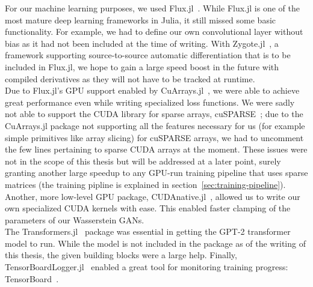 For our machine learning purposes, we used
Flux.jl~\cite{FluxMLFluxJl2019}. While Flux.jl is one of the most
mature deep learning frameworks in Julia, it still missed some basic
functionality. For example, we had to define our own convolutional
layer without bias as it had not been included at the time of writing.
With Zygote.jl~\cite{FluxMLZygoteJl2019}, a framework supporting
source-to-source automatic differentiation that is to be included in
Flux.jl, we hope to gain a large speed boost in the future with
compiled derivatives as they will not have to be tracked at runtime.
\\
Due to Flux.jl's GPU support enabled by
CuArrays.jl~\cite{JuliaGPUCuArraysJl2019}, we were able to achieve
great performance even while writing specialized loss functions. We
were sadly not able to support the CUDA library for sparse arrays,
cuSPARSE~\cite{CuSPARSE}; due to the CuArrays.jl package not
supporting all the features necessary for us (for example simple
primitives like array slicing) for cuSPARSE arrays, we had to
uncomment the few lines pertaining to sparse CUDA arrays at the
moment. These issues were not in the scope of this thesis but will be
addressed at a later point, surely granting another large speedup to
any GPU-run training pipeline that uses sparse matrices (the training
pipline is explained in section~\ref{sec:training-pipeline}). Another,
more low-level GPU package,
CUDAnative.jl~\cite{JuliaGPUCUDAnativeJl2019}, allowed us to write our
own specialized CUDA kernels with ease. This enabled faster clamping
of the parameters of our Wasserstein GANs. \\
The Transformers.jl~\cite{peterChengchingwenTransformersJl2019}
package was essential in getting the GPT-2 transformer model to run.
While the model is not included in the package as of the writing of
this thesis, the given building blocks were a large help. Finally,
TensorBoardLogger.jl~\cite{vicentiniPhilipVincTensorBoardLoggerJl2019}
enabled a great tool for monitoring training progress:
TensorBoard~\cite{TensorBoard}.



